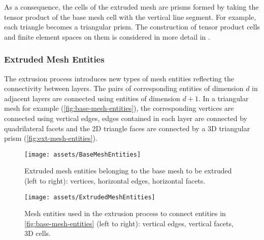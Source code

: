 \documentclass[11pt, a4paper]{scrartcl}
\begin{document}
As a consequence, the cells of the extruded mesh are prisms formed by
taking the tensor product of the base mesh cell with the vertical line
segment. For example, each triangle becomes a triangular prism.  The
construction of tensor product cells and finite element spaces on them
is considered in more detail in \citet{McRae:2016}.

\subsubsection{Extruded Mesh Entities}
\label{sssec:extruded-mesh-entities}

The extrusion process introduces new types of mesh entities reflecting
the connectivity between layers. The pairs of corresponding entities
of dimension $d$ in adjacent layers are connected using entities of
dimension $d+1$. In a triangular mesh for example
(\autoref{fig:base-mesh-entities}), the corresponding vertices are connected
using vertical edges, edges contained in each layer are connected by
quadrilateral facets and the 2D triangle faces are connected by a 3D
triangular prism (\autoref{fig:ext-mesh-entities}).
\begin{figure}[htbp]
\centering
\texttt{[image: assets/BaseMeshEntities]}
\caption{Extruded mesh entities belonging to the base mesh to be
  extruded (left to right): vertices, horizontal edges, horizontal
  facets.}
\label{fig:base-mesh-entities}
\end{figure}
\begin{figure}[htbp]
\centering
\texttt{[image: assets/ExtrudedMeshEntities]}
\caption{Mesh entities used in the extrusion process to connect
  entities in \autoref{fig:base-mesh-entities} (left to right):
  vertical edges, vertical facets, 3D cells.}
\label{fig:ext-mesh-entities}
\end{figure}
\end{document}
